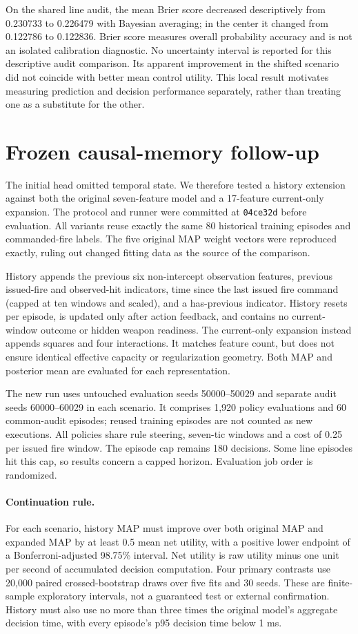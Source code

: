 \documentclass[11pt]{article}
\begin{document}
On the shared line audit, the mean Brier score decreased descriptively from 0.230733 to 0.226479 with Bayesian averaging; in the center it changed from 0.122786 to 0.122836. Brier score measures overall probability accuracy and is not an isolated calibration diagnostic. No uncertainty interval is reported for this descriptive audit comparison. Its apparent improvement in the shifted scenario did not coincide with better mean control utility. This local result motivates measuring prediction and decision performance separately, rather than treating one as a substitute for the other.

\section{Frozen causal-memory follow-up}
The initial head omitted temporal state. We therefore tested a history extension against both the original seven-feature model and a 17-feature current-only expansion. The protocol and runner were committed at \texttt{04ce32d} before evaluation. All variants reuse exactly the same 80 historical training episodes and commanded-fire labels. The five original MAP weight vectors were reproduced exactly, ruling out changed fitting data as the source of the comparison.

History appends the previous six non-intercept observation features, previous issued-fire and observed-hit indicators, time since the last issued fire command (capped at ten windows and scaled), and a has-previous indicator. History resets per episode, is updated only after action feedback, and contains no current-window outcome or hidden weapon readiness. The current-only expansion instead appends squares and four interactions. It matches feature count, but does not ensure identical effective capacity or regularization geometry. Both MAP and posterior mean are evaluated for each representation.

The new run uses untouched evaluation seeds 50000--50029 and separate audit seeds 60000--60029 in each scenario. It comprises 1,920 policy evaluations and 60 common-audit episodes; reused training episodes are not counted as new executions. All policies share rule steering, seven-tic windows and a cost of 0.25 per issued fire window. The episode cap remains 180 decisions. Some line episodes hit this cap, so results concern a capped horizon. Evaluation job order is randomized.

\paragraph{Continuation rule.}
For each scenario, history MAP must improve over both original MAP and expanded MAP by at least 0.5 mean net utility, with a positive lower endpoint of a Bonferroni-adjusted 98.75\% interval. Net utility is raw utility minus one unit per second of accumulated decision computation. Four primary contrasts use 20,000 paired crossed-bootstrap draws over five fits and 30 seeds. These are finite-sample exploratory intervals, not a guaranteed test or external confirmation. History must also use no more than three times the original model's aggregate decision time, with every episode's p95 decision time below 1 ms.
\end{document}
